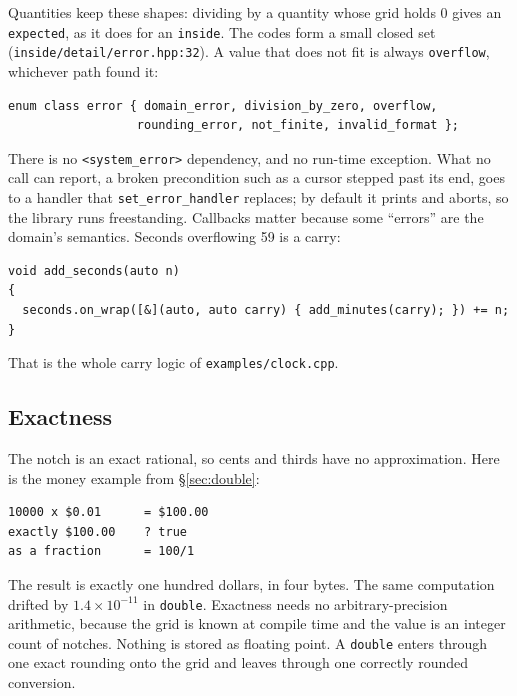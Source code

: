 \documentclass[11pt,a4paper]{article}
\newcommand{\code}[1]{\texttt{\small #1}}
\newcommand{\file}[1]{\texttt{\small #1}}
\begin{document}
\noindent
Quantities keep these shapes: dividing by a quantity whose grid holds 0 gives
an \code{expected}, as it does for an \code{inside}. The codes form a small closed set (\file{inside/detail/error.hpp:32}). A value that
does not fit is always \code{overflow}, whichever path found it:

\begin{lstlisting}
enum class error { domain_error, division_by_zero, overflow,
                  rounding_error, not_finite, invalid_format };
\end{lstlisting}

\noindent
There is no \code{<system\_error>} dependency, and no run-time exception.
What no call can report, a broken precondition such as a cursor stepped past
its end, goes to a handler that \code{set\_error\_handler} replaces; by
default it prints and aborts, so the library runs freestanding. Callbacks matter because some ``errors'' are the
domain's semantics. Seconds overflowing 59 is a carry:

\begin{lstlisting}
void add_seconds(auto n)
{
  seconds.on_wrap([&](auto, auto carry) { add_minutes(carry); }) += n;
}
\end{lstlisting}

\noindent
That is the whole carry logic of \file{examples/clock.cpp}.

\subsection{Exactness}

The notch is an exact rational, so cents and thirds have no approximation. Here
is the money example from \S\ref{sec:double}:


\begin{lstlisting}[style=term]
10000 x $0.01      = $100.00
exactly $100.00    ? true
as a fraction      = 100/1
\end{lstlisting}

\noindent
The result is exactly one hundred dollars, in four bytes. The same computation
drifted by $1.4\times10^{-11}$ in \code{double}. Exactness needs no
arbitrary-precision arithmetic, because the grid is known at compile time and
the value is an integer count of notches. Nothing is stored as floating point.
A \code{double} enters through one exact rounding onto the grid and leaves
through one correctly rounded conversion.
\end{document}
